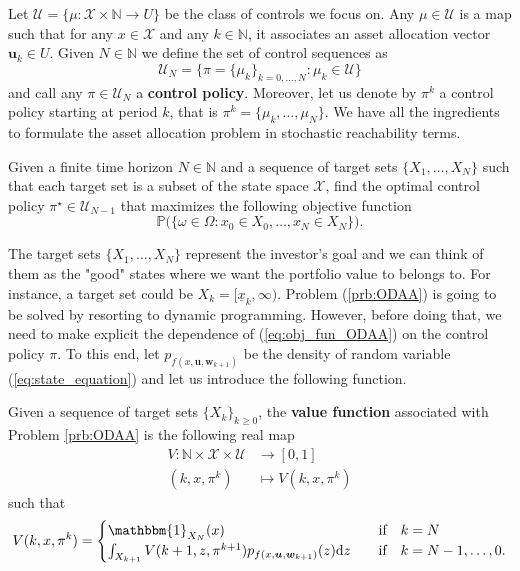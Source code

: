 Let $\mathcal{U} = \big\{ \mu : \mathcal{X} \times \mathbb{N} \rightarrow U \big\}$ be the class of controls we focus on. Any $\mu \in \mathcal{U}$ is a map such that for any $x \in \mathcal{X}$ and any $k \in \mathbb{N}$, it associates an asset allocation vector $\bm{u}_k \in U$.
Given $N \in \mathbb{N}$ we define the set of control sequences as \[\mathcal{U}_N = \Big\{\pi = \{\mu_k\}_{k=0,\ldots,N}  : \mu_k \in \mathcal{U} \Big\}\] and call any $\pi \in \mathcal{U}_N$ a \textbf{control policy}. Moreover, let us denote by $\pi^k$ a control policy starting at period $k$, that is $\pi^k=\{\mu_k,\ldots,\mu_N\}$. We have all the ingredients to formulate the asset allocation problem in stochastic reachability terms.
\begin{problem}\label{prb:ODAA}
Given a finite time horizon $N \in \mathbb{N}$ and a sequence of target sets $\{X_1,\ldots,X_N \} $ such that each target set is a subset of the state space $\mathcal{X}$, find the optimal control policy $\pi^{\star} \in \mathcal{U}_{N-1}$ that maximizes the following objective function 
\begin{equation}\label{eq:obj_fun_ODAA}
\mathbb{P}\Big(\big\{\omega \in \Omega : x_0 \in X_0,\ldots,x_N \in X_N \big\} \Big).
\end{equation}
\end{problem}
The target sets $\{X_1,\ldots,X_N \}$ represent the investor's goal and we can think of them as the "good" states where we want the portfolio value to belongs to. For instance, a target set could be $X_k = [\underline{x}_k,\infty)$. Problem (\ref{prb:ODAA}) is going to be solved by resorting to dynamic programming. However, before doing that, we need to make explicit the dependence of (\ref{eq:obj_fun_ODAA}) on the control policy $\pi$. To this end, let $p_{f(x,\bm{u},\bm{w}_{k+1})}$ be the density of random variable (\ref{eq:state_equation}) and let us introduce the following function.
\begin{definition}
	Given a sequence of target sets $\{X_k\}_{k\geq0}$, the \textbf{value function} associated with Problem \ref{prb:ODAA} is the following real map
	\begin{align*}
	V \colon \mathbb{N}\times \mathcal{X}\times \mathcal{U} & \rightarrow [0,1]\\
	(k,x,\pi^k) & \mapsto V(k,x,\pi^k)
	\end{align*}
	such that 
	\[V(k,x,\pi^k)=
	\begin{cases}
	    \mathbbm{1}_{X_N}(x) & \quad \text{if} \quad k = N \\
	    \int_{X_{k+1}}V(k+1,z,\pi^{k+1})p_{f(x,\bm{u},\bm{w}_{k+1})}(z)\mathrm{d}z & \quad \text{if} \quad k = N-1,\ldots,0.
	\end{cases}
	\]
	\end{definition}

